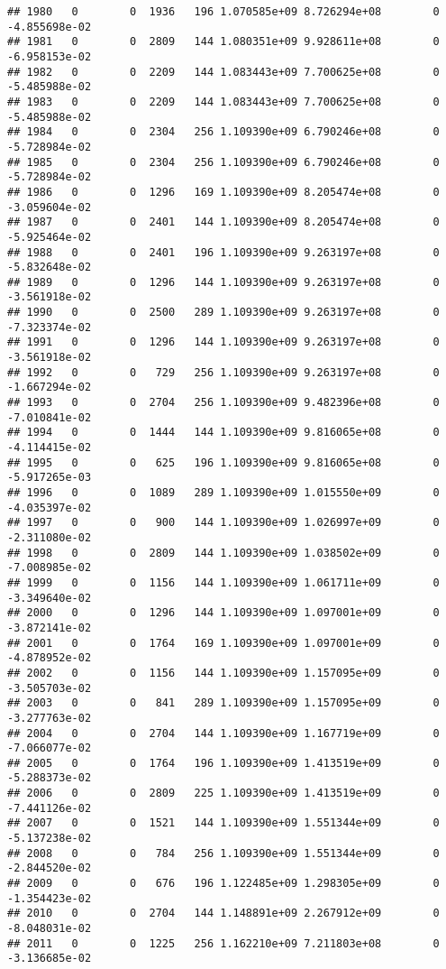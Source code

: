 \documentclass[
]{article}
\begin{document}
\begin{enumerate}
\begin{verbatim}
## 1980   0        0  1936   196 1.070585e+09 8.726294e+08        0 -4.855698e-02
## 1981   0        0  2809   144 1.080351e+09 9.928611e+08        0 -6.958153e-02
## 1982   0        0  2209   144 1.083443e+09 7.700625e+08        0 -5.485988e-02
## 1983   0        0  2209   144 1.083443e+09 7.700625e+08        0 -5.485988e-02
## 1984   0        0  2304   256 1.109390e+09 6.790246e+08        0 -5.728984e-02
## 1985   0        0  2304   256 1.109390e+09 6.790246e+08        0 -5.728984e-02
## 1986   0        0  1296   169 1.109390e+09 8.205474e+08        0 -3.059604e-02
## 1987   0        0  2401   144 1.109390e+09 8.205474e+08        0 -5.925464e-02
## 1988   0        0  2401   196 1.109390e+09 9.263197e+08        0 -5.832648e-02
## 1989   0        0  1296   144 1.109390e+09 9.263197e+08        0 -3.561918e-02
## 1990   0        0  2500   289 1.109390e+09 9.263197e+08        0 -7.323374e-02
## 1991   0        0  1296   144 1.109390e+09 9.263197e+08        0 -3.561918e-02
## 1992   0        0   729   256 1.109390e+09 9.263197e+08        0 -1.667294e-02
## 1993   0        0  2704   256 1.109390e+09 9.482396e+08        0 -7.010841e-02
## 1994   0        0  1444   144 1.109390e+09 9.816065e+08        0 -4.114415e-02
## 1995   0        0   625   196 1.109390e+09 9.816065e+08        0 -5.917265e-03
## 1996   0        0  1089   289 1.109390e+09 1.015550e+09        0 -4.035397e-02
## 1997   0        0   900   144 1.109390e+09 1.026997e+09        0 -2.311080e-02
## 1998   0        0  2809   144 1.109390e+09 1.038502e+09        0 -7.008985e-02
## 1999   0        0  1156   144 1.109390e+09 1.061711e+09        0 -3.349640e-02
## 2000   0        0  1296   144 1.109390e+09 1.097001e+09        0 -3.872141e-02
## 2001   0        0  1764   169 1.109390e+09 1.097001e+09        0 -4.878952e-02
## 2002   0        0  1156   144 1.109390e+09 1.157095e+09        0 -3.505703e-02
## 2003   0        0   841   289 1.109390e+09 1.157095e+09        0 -3.277763e-02
## 2004   0        0  2704   144 1.109390e+09 1.167719e+09        0 -7.066077e-02
## 2005   0        0  1764   196 1.109390e+09 1.413519e+09        0 -5.288373e-02
## 2006   0        0  2809   225 1.109390e+09 1.413519e+09        0 -7.441126e-02
## 2007   0        0  1521   144 1.109390e+09 1.551344e+09        0 -5.137238e-02
## 2008   0        0   784   256 1.109390e+09 1.551344e+09        0 -2.844520e-02
## 2009   0        0   676   196 1.122485e+09 1.298305e+09        0 -1.354423e-02
## 2010   0        0  2704   144 1.148891e+09 2.267912e+09        0 -8.048031e-02
## 2011   0        0  1225   256 1.162210e+09 7.211803e+08        0 -3.136685e-02

\end{verbatim}
\end{enumerate}
\end{document}
